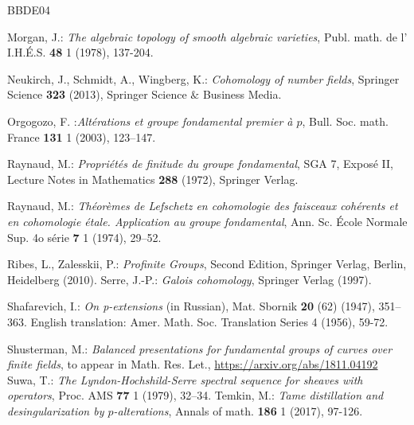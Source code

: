 \documentclass[12pt]{amsart}
\theoremstyle{plain}
\theoremstyle{definition}
\numberwithin{thm}{section}
\newcommand{\Q}{{\mathbb Q}}
\numberwithin{equation}{section}
\begin{document}
\begin{thebibliography}{BBDE04}

 Morgan, J.: \emph{The algebraic topology of smooth algebraic varieties}, 
Publ. math. de l' I.H.\'E.S. {\bf 48} 1 (1978), 137-204.


  Neukirch, J.,  Schmidt, A.,  Wingberg, K.: \emph{Cohomology of number fields},  Springer Science  {\bf 323} (2013),  Springer Science $\&$ Business Media.

 Orgogozo, F. :{\it Alt\'erations et groupe fondamental premier \`a $p$}, Bull. Soc. math. France {\bf 131} 1 (2003), 123--147.

 Raynaud, M.: \emph{Propri\'{e}t\'{e}s de finitude du groupe fondamental}, SGA 7, Expos\'e  II, Lecture Notes in Mathematics  {\bf 288} (1972), Springer Verlag.

 Raynaud, M.: \emph{Th\'eor\`emes de Lefschetz en cohomologie des faisceaux coh\'erents et en cohomologie \'etale. Application au groupe fondamental}, Ann. Sc. \'Ecole Normale Sup. 4o s\'erie {\bf 7} 1 (1974), 29--52.

 Ribes, L.,  Zalesskii, P.: \emph{Profinite Groups}, Second Edition, Springer Verlag, Berlin, Heidelberg (2010).
 Serre, J.-P.: {\it Galois cohomology}, Springer Verlag (1997).  

 Shafarevich, I.:  \emph{On p-extensions} (in Russian), Mat. Sbornik {\bf 20} (62) (1947), 351--363. English translation: Amer. Math. Soc. Translation Series 4 (1956), 59-72.


 Shusterman, M.: {\it  Balanced presentations for fundamental groups of curves over finite fields}, to appear in Math. Res. Let.,  {\url{https://arxiv.org/abs/1811.04192}}
 Suwa, T.:  {\it The Lyndon-Hochshild-Serre spectral sequence for sheaves with operators},  Proc. AMS {\bf 77} 1 (1979), 32--34. 
  Temkin, M.: {\it Tame distillation and desingularization by $p$-alterations}, Annals of math. {\bf 186} 1 (2017), 97-126. 
 

\end{thebibliography}
\end{document}
